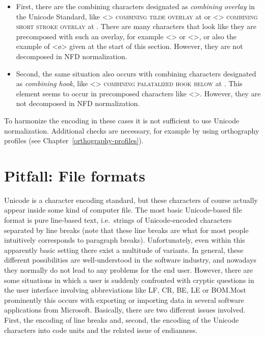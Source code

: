 \begin{itemize}
  
  \item First, there are the combining characters designated as \textit{combining
        overlay} in the Unicode Standard, like <>
        \textsc{combining tilde overlay} at  or <>
        \textsc{combining short stroke overlay} at . There are many
        characters that look like they are precomposed with such an overlay,
        for example <> or <>, or also the
        example of <ø> given at the start of this section. However, they are 
        not decomposed in NFD normalization.
  \item Second, the same situation also occurs with combining characters
        designated as \textit{combining hook}, like 
        <{}> \textsc{combining
        palatalized hook below} at . This element seems to occur in
        precomposed characters like <>. However, they are 
        not decomposed in NFD normalization.
        
\end{itemize}

To harmonize the encoding in these cases it is not sufficient to use Unicode 
normalization. Additional checks are necessary, for example by using orthography 
profiles (see Chapter~\ref{orthography-profiles}).

\section{Pitfall: File formats}
\label{pitfall-file-formats}

Unicode is a character encoding standard, but these characters of course
actually appear inside some kind of computer file. The most basic Unicode-based file
format is pure line-based text, i.e.~strings of Unicode-encoded characters
separated by line breaks (note that these line breaks are what for most people
intuitively corresponds to paragraph breaks). Unfortunately, even within this
apparently basic setting there exist a multitude of variants. In general, these
different possibilities are well-understood in the software industry, and
nowadays they normally do not lead to any problems for the end user. However,
there are some situations in which a user is suddenly confronted with cryptic
questions in the user interface involving abbreviations like LF, CR, BE, LE or
BOM.\@ Most prominently this occurs with exporting or importing data in several
software applications from Microsoft. Basically, there are two different issues
involved. First, the encoding of line breaks and, second, the encoding of the
Unicode characters into code units and the related issue of endianness.

